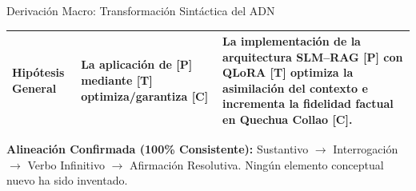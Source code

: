 \documentclass[aspectratio=169, 10pt, spanish]{beamer}
\begin{document}
\begin{frame}{Derivación Macro: Transformación Sintáctica del ADN}
\begin{center}
\begin{tabularx}{\textwidth}{l p{3.2cm} X}
        \addlinespace[0.15cm]
        \textbf{Hipótesis General} & 
        La aplicación de \textbf{\color{bpBlue}[P]} mediante \textbf{\color{bpGold!90!black}[T]} optimiza/garantiza \textbf{\color{bpRust}[C]} & 
        La implementación de la arquitectura SLM--RAG \textbf{\color{bpBlue}[P]} con QLoRA \textbf{\color{bpGold!90!black}[T]} optimiza la asimilación del contexto e incrementa la fidelidad factual en Quechua Collao \textbf{\color{bpRust}[C]}. \\
        \bottomrule
    \end{tabularx}
    \end{center}

    \vspace{0.15cm}
    \begin{tcolorbox}[colback=bpGreen!10!white, colframe=bpGreen!80!black, arc=1.2mm, left=2mm, right=2mm, top=1.2mm, bottom=1.2mm]
        \tiny\textbf{\color{bpGreen!80!black}Alineación Confirmada (100\% Consistente):}
        Sustantivo $\rightarrow$ Interrogación $\rightarrow$ Verbo Infinitivo $\rightarrow$ Afirmación Resolutiva. Ningún elemento conceptual nuevo ha sido inventado.
    \end{tcolorbox}
\end{frame}
\end{document}
